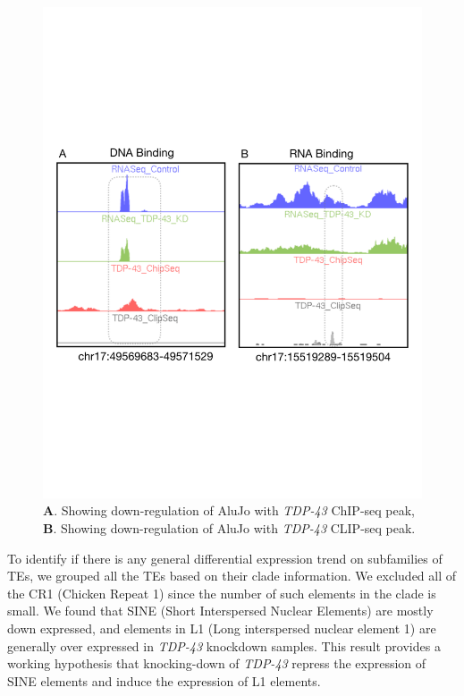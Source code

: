 \documentclass[wsdraft]{ws-procs11x85}
\begin{document}
\begin{figure}[h]
\centerline{
\includegraphics[width=16cm]{fig_hari}
}
\caption{
\textbf{A}. Showing down-regulation of AluJo with \textit{TDP-43} ChIP-seq peak,
\textbf{B}. Showing down-regulation of AluJo with \textit{TDP-43} CLIP-seq peak.
}
\label{aba:fig_hari}
\end{figure}


To identify if there is any general differential expression trend on subfamilies of TEs, we grouped all the TEs based on their clade information. We excluded all of the CR1 (Chicken Repeat 1) since the number of such elements in the clade is small.
We found that SINE (Short Interspersed Nuclear Elements) are mostly down expressed,
and elements in L1 (Long interspersed nuclear element 1) are generally over expressed in \textit{TDP-43} knockdown samples. 
This result provides a working hypothesis that knocking-down of \textit{TDP-43}  repress the expression of SINE elements and induce the expression of L1 elements.
\end{document}
